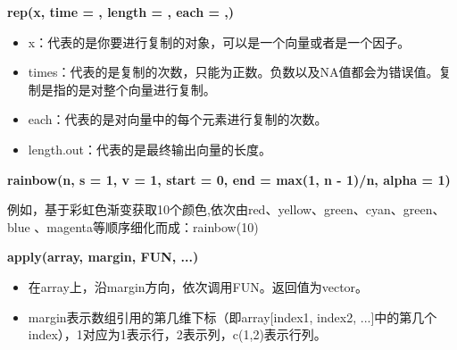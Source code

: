 \documentclass[11pt,a4paper,oneside]{book}
\begin{document}
\begin{tcolorbox}[colback=pink!10!white,colframe=pink!100!black]
	\textbf{rep(x, time = , length = , each = ,)}
	\begin{itemize}
		\item x：代表的是你要进行复制的对象，可以是一个向量或者是一个因子。
		\item times：代表的是复制的次数，只能为正数。负数以及NA值都会为错误值。复制是指的是对整个向量进行复制。
		\item each：代表的是对向量中的每个元素进行复制的次数。
		\item length.out：代表的是最终输出向量的长度。 
	\end{itemize}
\end{tcolorbox}
\begin{tcolorbox}[colback=pink!10!white,colframe=pink!100!black]
	\textbf{rainbow(n, s = 1, v = 1, start = 0, end = max(1, n - 1)/n, alpha = 1)}

例如，基于彩虹色渐变获取10个颜色,依次由red、yellow、green、cyan、green、blue 、magenta等顺序细化而成：rainbow(10)
\end{tcolorbox}
\begin{tcolorbox}[colback=pink!10!white,colframe=pink!100!black]
	\textbf{apply(array, margin, FUN, ...)}
	\begin{itemize}
		\item 在array上，沿margin方向，依次调用FUN。返回值为vector。
		\item margin表示数组引用的第几维下标（即array[index1, index2, ...]中的第几个index），1对应为1表示行，2表示列，c(1,2)表示行列。
	\end{itemize}
\end{tcolorbox}
\end{document}
